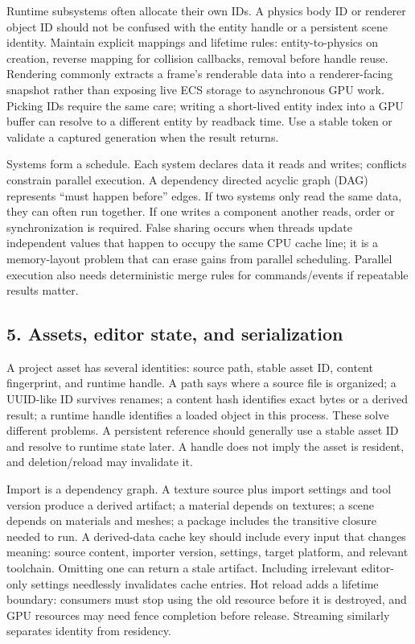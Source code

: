 Runtime subsystems often allocate their own IDs. A physics body ID or renderer object ID should not be confused with the entity handle or a persistent scene identity. Maintain explicit mappings and lifetime rules: entity-to-physics on creation, reverse mapping for collision callbacks, removal before handle reuse. Rendering commonly extracts a frame's renderable data into a renderer-facing snapshot rather than exposing live ECS storage to asynchronous GPU work. Picking IDs require the same care; writing a short-lived entity index into a GPU buffer can resolve to a different entity by readback time. Use a stable token or validate a captured generation when the result returns.

Systems form a schedule. Each system declares data it reads and writes; conflicts constrain parallel execution. A dependency directed acyclic graph (DAG) represents ``must happen before'' edges. If two systems only read the same data, they can often run together. If one writes a component another reads, order or synchronization is required. False sharing occurs when threads update independent values that happen to occupy the same CPU cache line; it is a memory-layout problem that can erase gains from parallel scheduling. Parallel execution also needs deterministic merge rules for commands/events if repeatable results matter.

\subsection{5. Assets, editor state, and serialization}\label{05-engine-i-ch008-assets-editor-state-and-serialization}

A project asset has several identities: source path, stable asset ID, content fingerprint, and runtime handle. A path says where a source file is organized; a UUID-like ID survives renames; a content hash identifies exact bytes or a derived result; a runtime handle identifies a loaded object in this process. These solve different problems. A persistent reference should generally use a stable asset ID and resolve to runtime state later. A handle does not imply the asset is resident, and deletion/reload may invalidate it.

Import is a dependency graph. A texture source plus import settings and tool version produce a derived artifact; a material depends on textures; a scene depends on materials and meshes; a package includes the transitive closure needed to run. A derived-data cache key should include every input that changes meaning: source content, importer version, settings, target platform, and relevant toolchain. Omitting one can return a stale artifact. Including irrelevant editor-only settings needlessly invalidates cache entries. Hot reload adds a lifetime boundary: consumers must stop using the old resource before it is destroyed, and GPU resources may need fence completion before release. Streaming similarly separates identity from residency.


